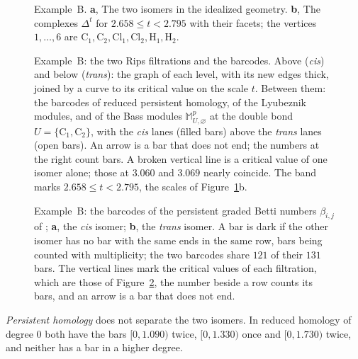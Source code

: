 \documentclass[11pt]{article}
\theoremstyle{plain}
\theoremstyle{definition}
\begin{document}
\begin{figure}[htbp]
\centering
{}
\caption{Example~B. \textbf{a}, The two isomers in the idealized geometry. \textbf{b}, The complexes $\Delta^t$ for $2.658\le t<2.795$ with their facets; the vertices $1,\dots,6$ are $\mathrm C_1,\mathrm C_2,\mathrm{Cl}_1,\mathrm{Cl}_2,\mathrm H_1,\mathrm H_2$.}\label{fig:app-B-molecules}
\end{figure}

\begin{figure}[htbp]
\centering
{}
\caption{Example~B: the two Rips filtrations and the barcodes. Above (\emph{cis}) and below (\emph{trans}): the graph of each level, with its new edges thick, joined by a curve to its critical value on the scale $t$. Between them: the barcodes of reduced persistent homology, of the Lyubeznik modules, and of the Bass modules $\mathbb M^p_{U,\varnothing}$ at the double bond $U=\{\mathrm C_1,\mathrm C_2\}$, with the \emph{cis} lanes (filled bars) above the \emph{trans} lanes (open bars). An arrow is a bar that does not end; the numbers at the right count bars. A broken vertical line is a critical value of one isomer alone; those at $3.060$ and $3.069$ nearly coincide. The band marks $2.658\le t<2.795$, the scales of Figure~\ref{fig:app-B-molecules}b.}\label{fig:app-B}
\end{figure}

\begin{figure}[htbp]
\centering
{}
\caption{Example~B: the barcodes of the persistent graded Betti numbers $\beta_{i,j}$ of \cite{SuwayyidWeiGraphs}; \textbf{a}, the \emph{cis} isomer; \textbf{b}, the \emph{trans} isomer. A bar is dark if the other isomer has no bar with the same ends in the same row, bars being counted with multiplicity; the two barcodes share $121$ of their $131$ bars. The vertical lines mark the critical values of each filtration, which are those of Figure~\ref{fig:app-B}, the number beside a row counts its bars, and an arrow is a bar that does not end.}\label{fig:app-B-betti}
\end{figure}

\emph{Persistent homology} does not separate the two isomers. In reduced homology of degree $0$ both have the bars $[0,1.090)$ twice, $[0,1.330)$ once and $[0,1.730)$ twice, and neither has a bar in a higher degree.
\end{document}
